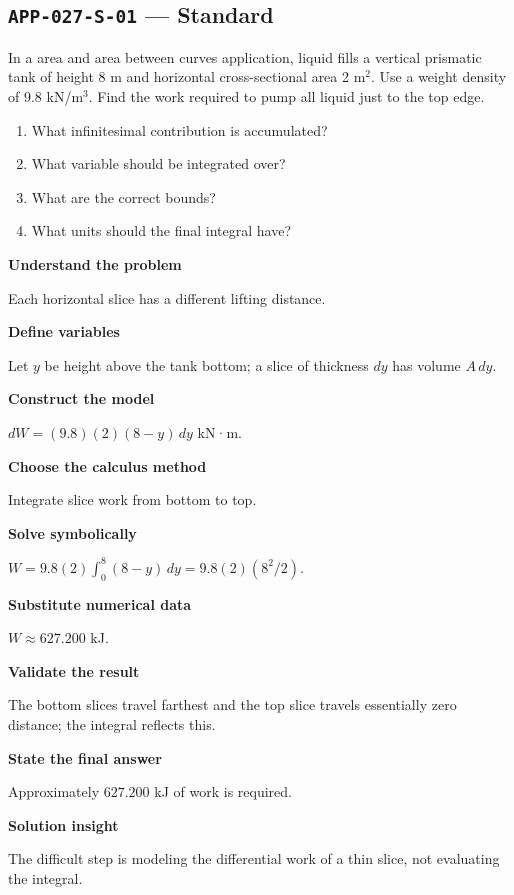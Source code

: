 \documentclass[11pt]{book}
\newcommand{\pid}[1]{\texttt{#1}}
\begin{document}
\subsection*{\pid{APP-027-S-01} — Standard}
\begin{problembox}
In a area and area between curves application, liquid fills a vertical prismatic tank of height 8 m and horizontal cross-sectional area 2 m$^2$. Use a weight density of 9.8 kN/m$^3$. Find the work required to pump all liquid just to the top edge.
\end{problembox}
\begin{promptbox}\begin{enumerate}
\item What infinitesimal contribution is accumulated?
\item What variable should be integrated over?
\item What are the correct bounds?
\item What units should the final integral have?
\end{enumerate}\end{promptbox}
\begin{solutionbox}
\textbf{Understand the problem}\par Each horizontal slice has a different lifting distance.\par\medskip
\textbf{Define variables}\par Let $y$ be height above the tank bottom; a slice of thickness $dy$ has volume $A\,dy$.\par\medskip
\textbf{Construct the model}\par $dW=(9.8)(2)(8-y)\,dy$ kN·m.\par\medskip
\textbf{Choose the calculus method}\par Integrate slice work from bottom to top.\par\medskip
\textbf{Solve symbolically}\par $W=9.8(2)\int_0^{8}(8-y)\,dy=9.8(2)(8^2/2)$.\par\medskip
\textbf{Substitute numerical data}\par $W\approx 627.200$ kJ.\par\medskip
\textbf{Validate the result}\par The bottom slices travel farthest and the top slice travels essentially zero distance; the integral reflects this.\par\medskip
\textbf{State the final answer}\par Approximately $627.200$ kJ of work is required.\par\medskip
\textbf{Solution insight}\par The difficult step is modeling the differential work of a thin slice, not evaluating the integral.\par\medskip
\end{solutionbox}
\end{document}
